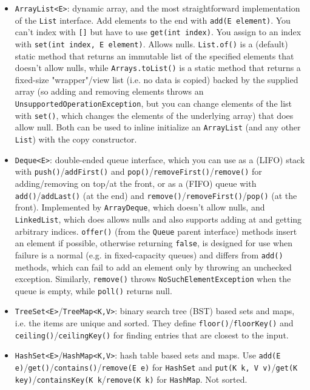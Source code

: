 \documentclass[8pt, table, xcdraw]{article}%
\begin{document}
\begin{itemize}
    \item \lstinline{ArrayList<E>}: dynamic array, and the most straightforward implementation of the \lstinline{List} interface. Add elements to the end with \lstinline{add(E element)}. You can't index with \lstinline{[]} but have to use \lstinline{get(int index)}. You assign to an index with \lstinline{set(int index, E element)}. Allows nulls. \lstinline{List.of()} is a (default) static method that returns an immutable list of the specified elements that doesn't allow nulls, while \lstinline{Arrays.toList()} is a static method that returns a fixed-size "wrapper"/view list (i.e. no data is copied) backed by the supplied array (so adding and removing elements throws an \lstinline{UnsupportedOperationException}, but you can change elements of the list with \lstinline{set()}, which changes the elements of the underlying array) that does allow null. Both can be used to inline initialize an \lstinline{ArrayList} (and any other \lstinline{List}) with the copy constructor.
    \item \lstinline{Deque<E>}: double-ended queue interface, which you can use as a (LIFO) stack with \lstinline{push()}/\lstinline{addFirst()} and \lstinline{pop()}/\lstinline{removeFirst()}/\lstinline{remove()} for adding/removing on top/at the front, or as a (FIFO) queue with \lstinline{add()}/\lstinline{addLast()} (at the end) and \lstinline{remove()}/\lstinline{removeFirst()}/\lstinline{pop()} (at the front). Implemented by \lstinline{ArrayDeque}, which doesn't allow nulls, and \lstinline{LinkedList}, which does allows nulls and also supports adding at and getting arbitrary indices. \lstinline{offer()} (from the \lstinline{Queue} parent interface) methods insert an element if possible, otherwise returning \lstinline{false}, is designed for use when failure is a normal (e.g. in fixed-capacity queues) and differs from \lstinline{add()} methods, which can fail to add an element only by throwing an unchecked exception. Similarly, \lstinline{remove()} throws \lstinline{NoSuchElementException} when the queue is empty, while \lstinline{poll()} returns null.
    \item \lstinline{TreeSet<E>}/\lstinline{TreeMap<K,V>}: binary search tree (BST) based sets and maps, i.e. the items are unique and sorted. They define \lstinline{floor()}/\lstinline{floorKey()} and \lstinline{ceiling()}/\lstinline{ceilingKey()} for finding entries that are closest to the input.
    \item \lstinline{HashSet<E>}/\lstinline{HashMap<K,V>}: hash table based sets and maps. Use \lstinline{add(E e)}/\lstinline{get()}/\lstinline{contains()}/\lstinline{remove(E e)} for \lstinline{HashSet} and \lstinline{put(K k, V v)}/\lstinline{get(K key)}/\lstinline{containsKey(K k}/\lstinline{remove(K k)} for \lstinline{HashMap}. Not sorted. 

\end{itemize}
\end{document}

